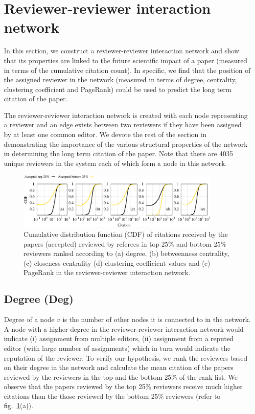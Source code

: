 \noindent
\section{Reviewer-reviewer interaction network}
\label{rev_int_net}
In this section, we construct a reviewer-reviewer interaction network and show that its properties are linked to the future scientific impact of a paper (measured in terms of the cumulative citation count). In specific, we find that the position of the assigned reviewer in the network (measured in terms of degree, centrality, clustering coefficient and PageRank) could be used to predict the long term citation of the paper. 
 
The reviewer-reviewer interaction network is created with each node representing a reviewer and an edge exists between two reviewers if they have been assigned by at least one common editor. We devote the rest of the section in demonstrating the importance of the various structural properties of the network in determining the long term citation of the paper. Note that there are 4035 unique reviewers in the system each of which form a node in this network.

\begin{figure}
\centering
\includegraphics[width = 0.9\textwidth]{./texfiles/Chapter_4/jcdl/figures/citation_.eps} 
\caption{\label{fig:net_citation} Cumulative distribution function (CDF) of citations received by the papers (accepted) reviewed by referees in top 25\% and bottom 25\% reviewers ranked according to (a) degree, (b) betweenness centrality, (c) closeness centrality (d) clustering coefficient values and (e) PageRank in the reviewer-reviewer interaction network.\vspace{4mm}}
\end{figure}

\subsection{Degree (Deg)}
Degree of a node $v$ is the number of other nodes it is connected to in the network. A node with a higher degree in the reviewer-reviewer interaction network would indicate (i) assignment from multiple editors, (ii) assignment from a reputed editor (with large number of assignments) which in turn would indicate the reputation of the reviewer. To verify our hypothesis, we rank the reviewers based on their degree in the network and calculate the mean citation of the papers reviewed by the reviewers in the top and the bottom 25\% of the rank list. We observe that  the papers reviewed by the top 25\% reviewers receive much higher citations than the those reviewed by the bottom 25\% reviewers (refer to fig.~\ref{fig:net_citation}(a)).    

